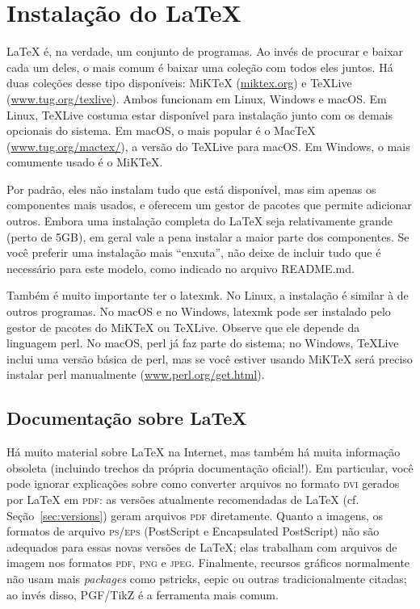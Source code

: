 
\chapter{Instalação do \LaTeX{}}
\label{chap:install}

\LaTeX{} é, na verdade, um conjunto de programas. Ao invés de procurar e
baixar cada um deles, o mais comum é baixar uma coleção com todos eles juntos.
Há duas coleções desse tipo disponíveis: MiK\TeX{} (\url{miktex.org}) e
\TeX{}Live (\url{www.tug.org/texlive}). Ambos funcionam em Linux, Windows e
macOS. Em Linux, \TeX{}Live costuma estar disponível para instalação junto
com os demais opcionais do sistema. Em macOS, o mais popular é o Mac\TeX{}
(\url{www.tug.org/mactex/}), a versão do \TeX{}Live para macOS. Em Windows,
o mais comumente usado é o MiK\TeX{}.

Por padrão, eles não instalam tudo que está disponível, mas sim apenas os
componentes mais usados, e oferecem um gestor de pacotes que permite adicionar
outros. Embora uma instalação completa do \LaTeX{} seja relativamente grande
(perto de 5GB), em geral vale a pena instalar a maior parte dos componentes.
Se você preferir uma instalação mais ``enxuta'', não deixe de incluir tudo
que é necessário para este modelo, como indicado no arquivo README.md.

Também é muito importante ter o \textsf{latexmk}. No Linux, a instalação
é similar à de outros programas. No macOS e no Windows, \textsf{latexmk}
pode ser instalado pelo gestor de pacotes do MiK\TeX{} ou \TeX{}Live.
Observe que ele depende da linguagem \textsf{perl}. No macOS, \textsf{perl}
já faz parte do sistema; no Windows, \TeX{}Live inclui uma versão básica
de perl, mas se você estiver usando MiK\TeX{} será preciso instalar
\textsf{perl} manualmente (\url{www.perl.org/get.html}).

\section{Documentação sobre \LaTeX}
\label{sec:docs}

Há muito material sobre \LaTeX{} na Internet, mas também há muita informação
obsoleta (incluindo trechos da própria documentação oficial!). Em particular,
você pode ignorar explicações sobre como converter arquivos no formato
\textsc{dvi} gerados por \LaTeX{} em \textsc{pdf}: as versões atualmente
recomendadas de \LaTeX{} (cf. Seção~\ref{sec:versions}) geram arquivos
\textsc{pdf} diretamente. Quanto a imagens, os formatos de arquivo
\textsc{ps/eps} (PostScript e Encapsulated PostScript) não são adequados
para essas novas versões de \LaTeX{}; elas trabalham com arquivos de imagem
nos formatos \textsc{pdf}, \textsc{png} e \textsc{jpeg}. Finalmente,
recursos gráficos normalmente não usam mais \textit{packages} como
\textsf{pstricks}, \textsf{eepic} ou outras tradicionalmente citadas;
ao invés disso, \textsf{PGF/TikZ} é a ferramenta mais comum.


